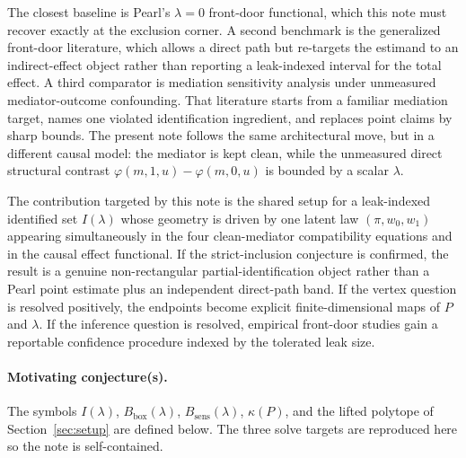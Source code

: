\documentclass[11pt]{article}
\theoremstyle{definition}
\theoremstyle{plain}
\theoremstyle{remark}
\begin{document}
The closest baseline is Pearl's \(\lambda=0\) front-door functional, which this note
must recover exactly at the exclusion corner. A second benchmark is the generalized
front-door literature, which allows a direct path but re-targets the estimand to an
indirect-effect object rather than reporting a leak-indexed interval for the total
effect. A third comparator is mediation sensitivity analysis under unmeasured
mediator-outcome confounding. That literature starts from a familiar mediation target,
names one violated identification ingredient, and replaces point claims by sharp
bounds. The present note follows the same architectural move, but in a different
causal model: the mediator is kept clean, while the unmeasured direct structural
contrast \(\varphi(m,1,u)-\varphi(m,0,u)\) is bounded by a scalar \(\lambda\).

The contribution targeted by this note is the shared setup for a leak-indexed
identified set \(I(\lambda)\) whose geometry is driven by one latent law
\((\pi,w_0,w_1)\) appearing simultaneously in the four clean-mediator compatibility
equations and in the causal effect functional. If the strict-inclusion conjecture is
confirmed, the result is a genuine non-rectangular partial-identification object rather
than a Pearl point estimate plus an independent direct-path band. If the vertex
question is resolved positively, the endpoints become explicit finite-dimensional maps
of \(P\) and \(\lambda\). If the inference question is resolved, empirical front-door
studies gain a reportable confidence procedure indexed by the tolerated leak size.

\paragraph{Motivating conjecture(s).}
The symbols \(I(\lambda)\), \(B_{\mathrm{box}}(\lambda)\), \(B_{\mathrm{sens}}(\lambda)\),
\(\kappa(P)\), and the lifted polytope of Section~\ref{sec:setup} are defined below.
The three solve targets are reproduced here so the note is self-contained.

\setcounter{stagezeroconjecture}{0}
\setcounter{stagezerooeq}{1}
\end{document}

